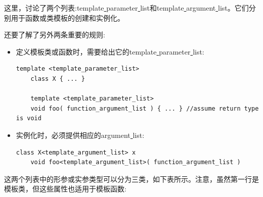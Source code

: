 这里，讨论了两个列表:template\underline{ }parameter\underline{ }list和template\underline{ }argument\underline{ }list。它们分别用于函数或类模板的创建和实例化。\par
还要了解了另外两条重要的规则: \par

\begin{itemize}
	\item 定义模板类或函数时，需要给出它的template\underline{ }parameter\underline{ }list:
	\begin{lstlisting}[caption={}]
	template <template_parameter_list>
	class X { ... }
	
	template <template_parameter_list>
	void foo( function_argument_list ) { ... } //assume return type is void
	\end{lstlisting}
	\item 实例化时，必须提供相应的argument\underline{ }list:
	\begin{lstlisting}[caption={}]
	class X<template_argument_list> x
	void foo<template_argument_list>( function_argument_list )
	\end{lstlisting}
\end{itemize}

这两个列表中的形参或实参类型可以分为三类，如下表所示。注意，虽然第一行是模板类，但这些属性也适用于模板函数: \par

